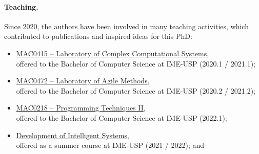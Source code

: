 \paragraph{Teaching.}
Since 2020, the authors have been involved in many teaching activities,
which contributed to publications and inspired ideas for this PhD:
\begin{itemize}
  \item \href{https://uspdigital.usp.br/jupiterweb/obterDisciplina?sgldis=MAC0475}%
        {MAC0415 -- Laboratory of Complex Computational Systems}, \\
        offered to the Bachelor of Computer Science at IME-USP (2020.1 / 2021.1);
  \item \href{https://uspdigital.usp.br/jupiterweb/obterDisciplina?sgldis=MAC0472}%
        {MAC0472 -- Laboratory of Agile Methods}, \\
        offered to the Bachelor of Computer Science at IME-USP (2020.2 / 2021.2);
  \item \href{https://uspdigital.usp.br/jupiterweb/obterDisciplina?sgldis=MAC0218}%
        {MAC0218 -- Programming Techniques II}, \\
        offered to the Bachelor of Computer Science at IME-USP (2022.1);
  \item \href{https://uspdigital.usp.br/apolo/apoObterAtividade?cod_oferecimentoatv=99168}%
        {Development of Intelligent Systems}, \\
        offered as a summer course at IME-USP (2021 / 2022); and
\end{itemize}
